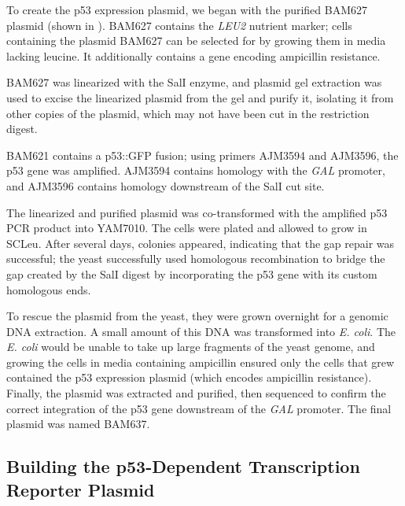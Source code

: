 To create the p53 expression plasmid, we began with the purified BAM627 plasmid (shown in ). BAM627 contains the \textit{LEU2} nutrient marker; cells containing the plasmid BAM627 can be selected for by growing them in media lacking leucine. It additionally contains a gene encoding ampicillin resistance.

BAM627 was linearized with the SalI enzyme, and plasmid gel extraction was used to excise the linearized plasmid from the gel and purify it, isolating it from other copies of the plasmid, which may not have been cut in the restriction digest.

BAM621 contains a p53::GFP fusion; using primers AJM3594 and AJM3596, the p53 gene was amplified. AJM3594 contains homology with the \textit{GAL} promoter, and AJM3596 contains homology downstream of the SalI cut site.

The linearized and purified plasmid was co-transformed with the amplified p53 PCR product into YAM7010. The cells were plated and allowed to grow in SC\textminus Leu. After several days, colonies appeared, indicating that the gap repair was successful; the yeast successfully used homologous recombination to bridge the gap created by the SalI digest by incorporating the p53 gene with its custom homologous ends.

To rescue the plasmid from the yeast, they were grown overnight for a genomic DNA extraction. A small amount of this DNA was transformed into \textit{E. coli}. The \textit{E. coli} would be unable to take up large fragments of the yeast genome, and growing the cells in media containing ampicillin ensured only the cells that grew contained the p53 expression plasmid (which encodes ampicillin resistance). Finally, the plasmid was extracted and purified, then sequenced to confirm the correct integration of the p53 gene downstream of the \textit{GAL} promoter. The final plasmid was named BAM637.

\subsection{Building the p53-Dependent Transcription Reporter Plasmid}

